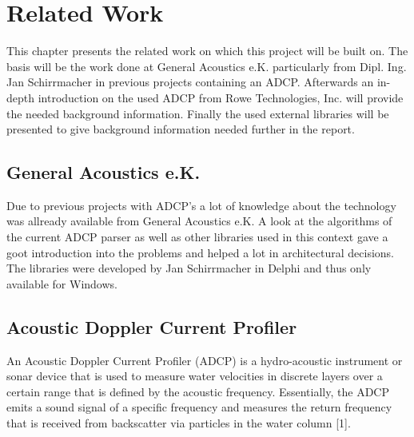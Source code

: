 \chapter{Related Work}
This chapter presents the related work on which this project will be built on. The basis will be the work done at General Acoustics e.K. particularly from Dipl. Ing. Jan Schirrmacher in previous projects containing an ADCP. Afterwards an in-depth introduction on the used ADCP from Rowe Technologies, Inc. will provide the needed background information. Finally the used external libraries will be presented to give background information needed further in the report.

\section{General Acoustics e.K.}
Due to previous projects with ADCP's a lot of knowledge about the technology was allready available from General Acoustics e.K. A look at the algorithms of the current ADCP parser as well as other libraries used in this context gave a goot introduction into the problems and helped a lot in architectural decisions. The libraries were developed by Jan Schirrmacher in Delphi and thus only available for Windows.

\section{Acoustic Doppler Current Profiler}
An Acoustic Doppler Current Profiler (ADCP) is a hydro-acoustic instrument or sonar device that is used to measure water velocities in discrete layers over a certain range that is defined by the acoustic frequency. Essentially, the ADCP emits a sound signal of a specific frequency and measures the return frequency that is received from backscatter via particles in the water column [1].

